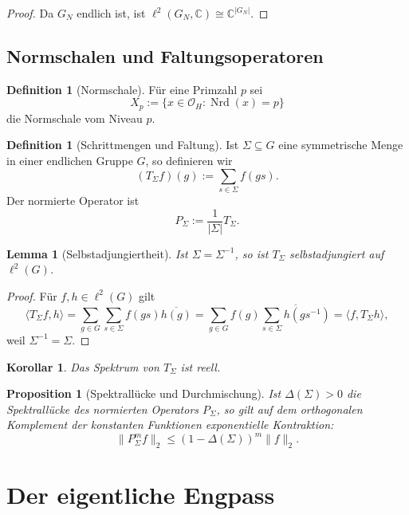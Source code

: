 \documentclass[12pt,a4paper]{article}
\theoremstyle{plain}
\newtheorem{lemma}[satz]{Lemma}
\newtheorem{proposition}[satz]{Proposition}
\newtheorem{korollar}[satz]{Korollar}
\theoremstyle{definition}
\newtheorem{definition}[satz]{Definition}
\theoremstyle{remark}
\newcommand{\OH}{\mathcal O_H}
\newcommand{\Cp}{\mathbb C}
\newcommand{\elltwo}{\ell^2}
\newcommand{\nrd}{\operatorname{Nrd}}
\begin{document}
	\begin{proof}
		Da \(G_N\) endlich ist, ist \(\elltwo(G_N,\Cp)\cong \Cp^{|G_N|}\).
	\end{proof}
	
	\subsection{Normschalen und Faltungsoperatoren}
	
	\begin{definition}[Normschale]
		Für eine Primzahl \(p\) sei
		\[
		X_p := \{x\in \OH : \nrd(x)=p\}
		\]
		die Normschale vom Niveau \(p\).
	\end{definition}
	
	\begin{definition}[Schrittmengen und Faltung]
		Ist \(\Sigma\subseteq G\) eine symmetrische Menge in einer endlichen Gruppe \(G\), so definieren wir
		\[
		(T_\Sigma f)(g):=\sum_{s\in\Sigma} f(gs).
		\]
		Der normierte Operator ist
		\[
		P_\Sigma := \frac{1}{|\Sigma|}T_\Sigma.
		\]
	\end{definition}
	
	\begin{lemma}[Selbstadjungiertheit]
		Ist \(\Sigma=\Sigma^{-1}\), so ist \(T_\Sigma\) selbstadjungiert auf \(\elltwo(G)\).
	\end{lemma}
	
	\begin{proof}
		Für \(f,h\in\elltwo(G)\) gilt
		\[
		\langle T_\Sigma f,h\rangle
		=
		\sum_{g\in G}\sum_{s\in\Sigma} f(gs)\overline{h(g)}
		=
		\sum_{g\in G} f(g)\overline{\sum_{s\in\Sigma} h(gs^{-1})}
		=
		\langle f,T_\Sigma h\rangle,
		\]
		weil \(\Sigma^{-1}=\Sigma\).
	\end{proof}
	
	\begin{korollar}
		Das Spektrum von \(T_\Sigma\) ist reell.
	\end{korollar}
	
	\begin{proposition}[Spektrallücke und Durchmischung]
		Ist \(\Delta(\Sigma)>0\) die Spektrallücke des normierten Operators \(P_\Sigma\), so gilt
		auf dem orthogonalen Komplement der konstanten Funktionen exponentielle Kontraktion:
		\[
		\|P_\Sigma^m f\|_2 \le (1-\Delta(\Sigma))^m \|f\|_2.
		\]
	\end{proposition}
	
	\section{Der eigentliche Engpass}
	
\end{document}
